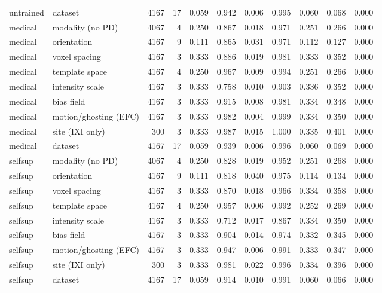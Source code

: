 \begin{tabular}{llrrrrrrrrr}
untrained & dataset & 4167 & 17 & 0.059 & 0.942 & 0.006 & 0.995 & 0.060 & 0.068 & 0.000 \\
medical & modality (no PD) & 4067 & 4 & 0.250 & 0.867 & 0.018 & 0.971 & 0.251 & 0.266 & 0.000 \\
medical & orientation & 4167 & 9 & 0.111 & 0.865 & 0.031 & 0.971 & 0.112 & 0.127 & 0.000 \\
medical & voxel spacing & 4167 & 3 & 0.333 & 0.886 & 0.019 & 0.981 & 0.333 & 0.352 & 0.000 \\
medical & template space & 4167 & 4 & 0.250 & 0.967 & 0.009 & 0.994 & 0.251 & 0.266 & 0.000 \\
medical & intensity scale & 4167 & 3 & 0.333 & 0.758 & 0.010 & 0.903 & 0.336 & 0.352 & 0.000 \\
medical & bias field & 4167 & 3 & 0.333 & 0.915 & 0.008 & 0.981 & 0.334 & 0.348 & 0.000 \\
medical & motion/ghosting (EFC) & 4167 & 3 & 0.333 & 0.982 & 0.004 & 0.999 & 0.334 & 0.350 & 0.000 \\
medical & site (IXI only) & 300 & 3 & 0.333 & 0.987 & 0.015 & 1.000 & 0.335 & 0.401 & 0.000 \\
medical & dataset & 4167 & 17 & 0.059 & 0.939 & 0.006 & 0.996 & 0.060 & 0.069 & 0.000 \\
selfsup & modality (no PD) & 4067 & 4 & 0.250 & 0.828 & 0.019 & 0.952 & 0.251 & 0.268 & 0.000 \\
selfsup & orientation & 4167 & 9 & 0.111 & 0.818 & 0.040 & 0.975 & 0.114 & 0.134 & 0.000 \\
selfsup & voxel spacing & 4167 & 3 & 0.333 & 0.870 & 0.018 & 0.966 & 0.334 & 0.358 & 0.000 \\
selfsup & template space & 4167 & 4 & 0.250 & 0.957 & 0.006 & 0.992 & 0.252 & 0.269 & 0.000 \\
selfsup & intensity scale & 4167 & 3 & 0.333 & 0.712 & 0.017 & 0.867 & 0.334 & 0.350 & 0.000 \\
selfsup & bias field & 4167 & 3 & 0.333 & 0.904 & 0.014 & 0.974 & 0.332 & 0.345 & 0.000 \\
selfsup & motion/ghosting (EFC) & 4167 & 3 & 0.333 & 0.947 & 0.006 & 0.991 & 0.333 & 0.347 & 0.000 \\
selfsup & site (IXI only) & 300 & 3 & 0.333 & 0.981 & 0.022 & 0.996 & 0.334 & 0.396 & 0.000 \\
selfsup & dataset & 4167 & 17 & 0.059 & 0.914 & 0.010 & 0.991 & 0.060 & 0.066 & 0.000 \\
\bottomrule
\end{tabular}
